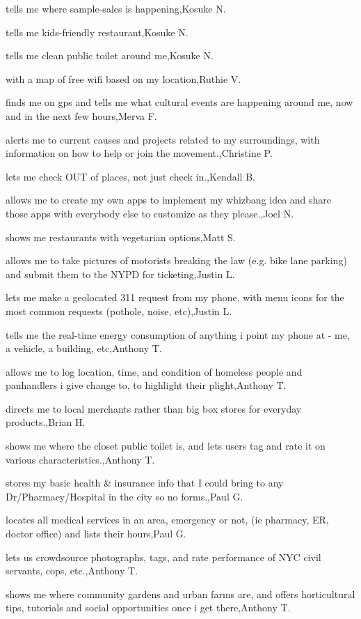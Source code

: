 \documentclass{article}
\begin{document}
tells me where sample-sales is happening,Kosuke N.

tells me kids-friendly restaurant,Kosuke N.

tells me clean public toilet around me,Kosuke N.

with a map of free wifi based on my location,Ruthie V.

finds me on gps and tells me what cultural events are happening around me, now and in the next few hours,Merva F.

alerts me to current causes and projects related to my surroundings, with information on how to help or join the movement.,Christine P.

lets me check OUT of places, not just check in.,Kendall B.

allows me to create my own apps to implement my whizbang idea and share those apps with everybody else to customize as they please.,Joel N.

shows me restaurants with vegetarian options,Matt S.

allows me to take pictures of motorists breaking the law (e.g. bike lane parking) and submit them to the NYPD for ticketing,Justin L.

lets me make a geolocated 311 request from my phone, with menu icons for the most common requests (pothole, noise, etc),Justin L.

tells me the real-time energy consumption of anything i point my phone at - me, a vehicle, a building, etc,Anthony T.

allows me to log location, time, and condition of homeless people and panhandlers i give change to, to highlight their plight,Anthony T.

directs me to local merchants rather than big box stores for everyday products.,Brian H.

shows me where the closet public toilet is, and lets users tag and rate it on various characteristics.,Anthony T.

stores my basic health \& insurance info that I could bring to any Dr/Pharmacy/Hospital in the city so no forms.,Paul G.

locates all medical services in an area, emergency or not, (ie pharmacy, ER, doctor office) and lists their hours,Paul G.

lets us crowdsource photographs, tags, and rate performance of NYC civil servants, cops, etc.,Anthony T.

shows me where community gardens and urban farms are, and offers horticultural tips, tutorials and social opportunities once i get there,Anthony T.
\end{document}
